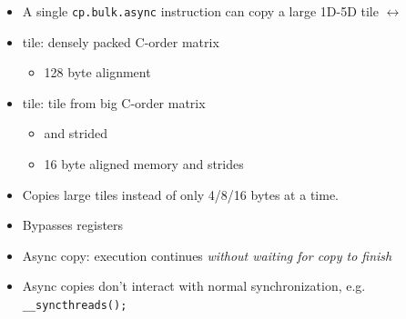 \begin{minipage}[t]{0.48\textwidth}\fixminipage
\begin{itemize}
\item A single \texttt{cp.bulk.async} instruction can copy a large 1D-5D tile $\leftrightarrow$
\item {} tile: densely packed C-order matrix
\begin{itemize}
  \item 128 byte alignment
\end{itemize}
\item {} tile: tile from big C-order matrix
\begin{itemize}
  \item {} and strided
  \item 16 byte aligned memory and strides
\end{itemize}
\end{itemize}


\begin{itemize}
  \item Copies large tiles instead of only 4/8/16 bytes at a time.
  \item Bypasses registers
  \item Async copy: execution continues \textit{without waiting for copy to finish}
  \item Async copies don't interact with normal synchronization, e.g. \texttt{\_\_syncthreads();}
\end{itemize}
\end{minipage}
\hfill
